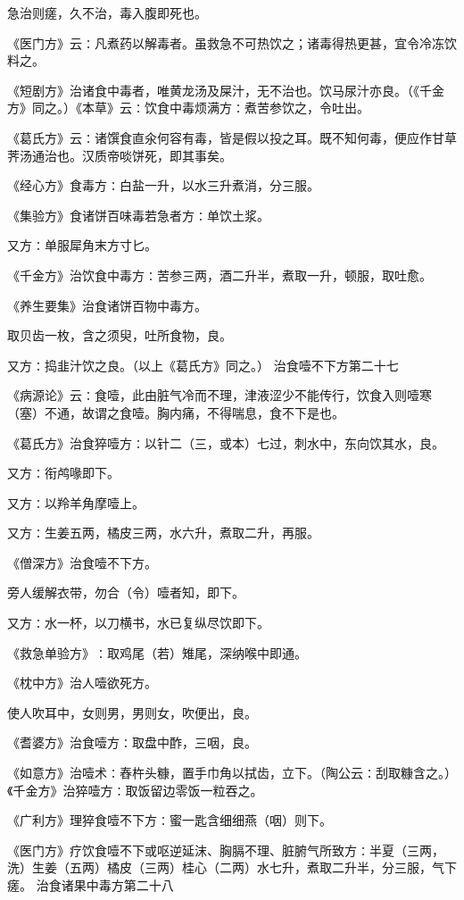 \documentclass[a4paper,12pt,UTF8,twoside]{ctexbook}
\begin{document}
急治则瘥，久不治，毒入腹即死也。

《医门方》云∶凡煮药以解毒者。虽救急不可热饮之；诸毒得热更甚，宜令冷冻饮料之。

《短剧方》治诸食中毒者，唯黄龙汤及屎汁，无不治也。饮马尿汁亦良。（《千金方》同之。）《本草》云∶饮食中毒烦满方∶煮苦参饮之，令吐出。

《葛氏方》云∶诸馔食直氽何容有毒，皆是假以投之耳。既不知何毒，便应作甘草荠汤通治也。汉质帝啖饼死，即其事矣。

《经心方》食毒方∶白盐一升，以水三升煮消，分三服。

《集验方》食诸饼百味毒若急者方∶单饮土浆。

又方∶单服犀角末方寸匕。

《千金方》治饮食中毒方∶苦参三两，酒二升半，煮取一升，顿服，取吐愈。

《养生要集》治食诸饼百物中毒方。

取贝齿一枚，含之须臾，吐所食物，良。

又方∶捣韭汁饮之良。（以上《葛氏方》同之。）
治食噎不下方第二十七

《病源论》云∶食噎，此由脏气冷而不理，津液涩少不能传行，饮食入则噎寒（塞）不通，故谓之食噎。胸内痛，不得喘息，食不下是也。

《葛氏方》治食猝噎方∶以针二（三，或本）七过，刺水中，东向饮其水，良。

又方∶衔鸬喙即下。

又方∶以羚羊角摩噎上。

又方∶生姜五两，橘皮三两，水六升，煮取二升，再服。

《僧深方》治食噎不下方。

旁人缓解衣带，勿合（令）噎者知，即下。

又方∶水一杯，以刀横书，水已复纵尽饮即下。

《救急单验方》∶取鸡尾（若）雉尾，深纳喉中即通。

《枕中方》治人噎欲死方。

使人吹耳中，女则男，男则女，吹便出，良。

《耆婆方》治食噎方∶取盘中酢，三咽，良。

《如意方》治噎术∶舂杵头糠，置手巾角以拭齿，立下。（陶公云∶刮取糠含之。）《千金方》治猝噎方∶取饭留边零饭一粒吞之。

《广利方》理猝食噎不下方∶蜜一匙含细细燕（咽）则下。

《医门方》疗饮食噎不下或呕逆延沫、胸膈不理、脏腑气所致方∶半夏（三两，洗）生姜（五两）橘皮（三两）桂心（二两）水七升，煮取二升半，分三服，气下瘥。
治食诸果中毒方第二十八
\end{document}
